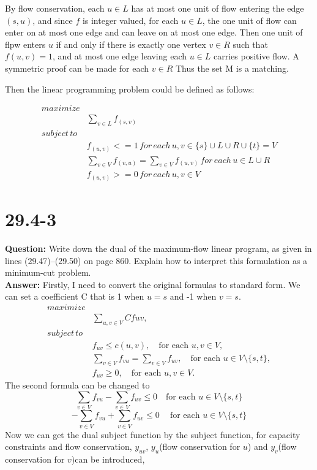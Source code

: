 \documentclass[12pt]{article}
\begin{document}
By flow conservation, each $u \in L$ has at most one unit of flow entering the edge $(s,u)$, and since $f$ is integer valued, for each $u \in L$, the one unit of flow can enter on at most one edge and can leave on at most one edge. Then one unit of flpw enters $u$ if and only if there is exactly one vertex $v \in R$ such that $f(u,v) = 1$, and at most one edge leaving each $u \in L$ carries positive flow. A symmetric proof can be made for each $v \in R$ Thus the set M is a matching.

Then the linear programming problem could be defined as follows:

\begin{equation}
\begin{aligned}
maximize& \\
& \sum_{v \in L} f_{(s,v)}\\
subject \, to&  \\
& f_{(u,v)} <=1 \, for \, each \, u,v \in \{s\} \cup L \cup R \cup \{t\} = V\\ 
& \sum_{v \in V} f_{(v,u)} = \sum_{v \in V} f_{(u,v)} \, for \, each \, u \in L \cup R\\
&f_{(u,v)} >= 0 \, for \,each \, u,v \in V
\end{aligned}
\end{equation}


\section{29.4-3}
\textbf{Question:}
Write down the dual of the maximum-flow linear program, as given in lines
(29.47)–(29.50) on page 860. Explain how to interpret this formulation as a
minimum-cut problem.\\
\textbf{Answer:}
Firstly, I need to convert the original formulas to standard form.
We can set a coefficient C that is 1 when \(u=s\) and -1 when \(v=s\).
\[
\begin{aligned}
maximize& \\
&\sum_{u,v \in V} Cfuv, \\
subject \, to& \\
&f_{uv} \leq c(u, v), \quad \text{for each } u, v \in V, \\
&\sum_{v \in V} f_{vu} = \sum_{v \in V} f_{uv}, \quad \text{for each } u \in V \setminus \{s, t\}, \\
&f_{uv} \geq 0, \quad \text{for each } u, v \in V.
\end{aligned}
\]
The second formula can be changed to 
\[
\sum_{v \in V} f_{vu} - \sum_{v \in V} f_{uv} \leq 0 \quad \text{for each } u \in V \setminus \{s, t\}
\]
\[-\sum_{v \in V} f_{vu} + \sum_{v \in V} f_{uv} \leq 0\ \quad \text{for each } u \in V \setminus \{s, t\}\]
Now we can get the dual subject function by the subject function, for capacity constraints and flow conservation, \(y_{uv}\), \(y_u\)(flow conservation for \(u\)) and \(y_v\)(flow conservation for \(v\))can be introduced, 
\end{document}
